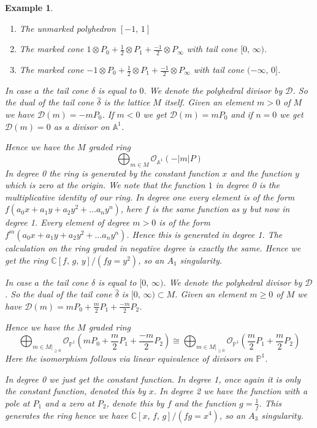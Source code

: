\documentclass[12pt]{amsart}
\theoremstyle{plain}
\newtheorem{ex}[thm]{Example}
\begin{document}
\begin{ex}
\begin{enumerate}[label =\alph*)]
\item The unmarked polyhedron $[-1, \, 1]$
\item The marked cone $1\otimes P_0 + \frac{1}{2} \otimes P_1 + \frac{-1}{2} \otimes P_\infty$ with tail cone $[0,\, \infty)$.
\item The marked cone $-1\otimes P_0 + \frac{1}{2} \otimes P_1 + \frac{-1}{2} \otimes P_\infty$ with tail cone $(-\infty, \, 0]$.
\end{enumerate}

In case $a$ the tail cone $\delta$ is equal to $0$. We denote the polyhedral divisor by $\mathcal{D}$. So the dual of the tail cone $\hat{\delta}$ is the lattice $M$ itself. Given an element $ m >0$ of $M$ we have $\mathcal{D}(m) = -mP_0$. If $m <0$ we get $\mathcal{D}(m) = mP_0$ and if $n=0$ we get $\mathcal{D}(m) = 0$ as a divisor on $\mathbb{A}^1$. 

Hence we have the $M$ graded ring
\[
\bigoplus_{m \in M} \mathcal{O}_{\mathbb{A}^1}(-|m|P)
\]
In degree 0 the ring is generated by the constant function $x$ and the function $y$ which is zero at the origin. We note that the function $1$ in degree 0 is the multiplicative identity of our ring. In degree one every element is of the form $f ( a_0 x + a_1 y + a_2 y^2 + \dots  a_n y^n)$, here $f$ is the same function as $y$ but now in degree 1. Every element of degree $m>0$ is of the form $f^m ( a_0 x + a_1 y + a_2 y^2 + \dots  a_n y^n)$. Hence this is generated in degree 1. The calculation on the ring graded in negative degree is exactly the same.  Hence we get the ring $\mathbb{C}[f,  \, g, \, y]/ (fg=y^2)$, so an $A_1$ singularity.


In case $a$ the tail cone $\delta$ is equal to $[0 ,  \, \infty)$. We denote the polyhedral divisor by $\mathcal{D}$. So the dual of the tail cone $\hat{\delta}$ is $[0 ,  \, \infty) \subset M$. Given an element $ m \geq 0$ of $M$ we have $\mathcal{D}(m) = mP_0 +\frac{m}{2} P_1 + \frac{-m}{2}P_2$. 

Hence we have the $M$ graded ring
\[
\bigoplus_{m \in M|_{\geq 0}} \mathcal{O}_{\mathbb{P}^1} \left(mP_0 +\frac{m}{2} P_1 + \frac{-m}{2}P_2 \right) \cong \bigoplus_{m \in M|_{\geq 0}} \mathcal{O}_{\mathbb{P}^1} \left(\frac{m}{2} P_1 + \frac{m}{2}P_2 \right)
\]
Here the isomorphism follows via linear equivalence of divisors on $\mathbb{P}^1$.

In degree 0 we just get the constant function. In degree 1, once again it is only the constant function, denoted this by $x$. In degree 2 we have the function with a pole at $P_1$ and a zero at $P_2$, denote this by $f$ and the function $g = \frac{1}{f}$. This generates the ring hence we have $\mathbb{C}[x, \, f, \, g]/(fg = x^4)$, so an $A_3$ singularity.



\end{ex}
\end{document}
